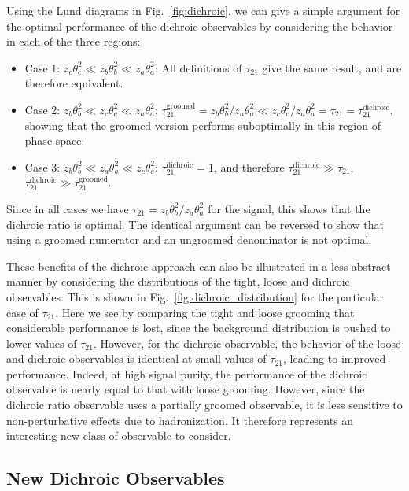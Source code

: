 \documentclass[11pt,letterpaper]{article}
\newcommand{\dichroic}{\text{dichroic}}
\newcommand{\groomed}{\text{groomed}}
\DeclareRobustCommand{\Fig}[1]{Fig.~\ref{#1}}
\begin{document}
Using the Lund diagrams in \Fig{fig:dichroic}, we can give a simple argument for the optimal performance of the dichroic observables by considering the behavior in each of the three regions:
\begin{itemize}
\item Case 1: $z_c \theta_c^2 \ll z_b \theta_b^2 \ll z_a \theta_a^2$: All definitions of $\tau_{21}$ give the same result, and are therefore equivalent.
\item Case 2: $z_b\theta_b^2 \ll z_c \theta_c^2 \ll z_a \theta_a^2$: $\tau_{21}^\groomed=z_b \theta_b^2/z_a \theta_a^2 \ll  z_c \theta_c^2/z_a \theta_a^2=\tau_{21}=\tau_{21}^\dichroic$, showing that the groomed version performs suboptimally in this region of phase space.
\item Case 3: $z_b \theta_b^2 \ll z_a \theta_a^2 \ll z_c \theta_c^2$: $\tau_{21}^\dichroic=1$, and therefore $\tau_{21}^\dichroic \gg \tau_{21}$, $\tau_{21}^\dichroic \gg \tau_{21}^\groomed$. 
\end{itemize}
Since in all cases we have $\tau_{21}=z_b\theta_b^2/z_a\theta_a^2$ for
the signal, this shows that the dichroic
ratio is optimal.
%
The identical argument can be reversed to show that
using a groomed numerator and an ungroomed denominator is not optimal.

These benefits of the dichroic approach can also be illustrated in a less abstract manner by considering the distributions of the tight, loose and dichroic observables. This is shown in \Fig{fig:dichroic_distribution} for the particular case of $\tau_{21}$. Here we see by comparing the tight and loose grooming that considerable performance is lost, since the background distribution is pushed to lower values of $\tau_{21}$. However, for the dichroic observable, the behavior of the loose and dichroic observables is identical at small values of $\tau_{21}$, leading to improved performance. Indeed, at high signal purity, the performance of the dichroic observable is nearly equal to that with loose grooming. However, since the dichroic ratio observable uses a partially groomed observable, it is less sensitive to non-perturbative effects due to hadronization.
%
It therefore represents an interesting new class of observable to consider. 

\subsection{New Dichroic Observables}\label{sec:dichroic_new}
\end{document}
